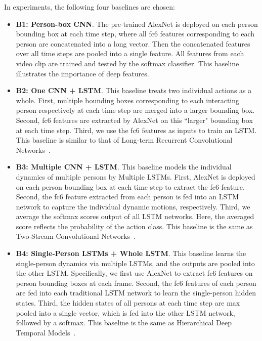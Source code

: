 \documentclass[9pt,journal,letterpaper,twocolumn]{IEEEtran}
\begin{document}
	
	In experiments, the following four baselines are chosen:
	\begin{itemize}
		\item {\bf B1: Person-box CNN}. The pre-trained AlexNet is deployed on each person bounding box at each time step, where all fc6 features corresponding to each person are concatenated into a long vector. Then the concatenated features over all time steps are pooled into a single feature. All features from each video clip are trained and tested by the softmax classifier. This baseline illustrates the importance of deep features.
		\item
		{\bf B2: One CNN + LSTM}. This baseline treats two individual actions as a whole.   First, multiple bounding boxes corresponding to each interacting person respectively at each time step are merged into a larger bounding box. Second, fc6 features are extracted by AlexNet on this ``larger" bounding box at each time step. Third, we use the fc6 features as inputs to train an LSTM. This baseline is similar to that of Long-term Recurrent Convolutional Networks~\cite{donahue2015long}.
		\item
		{\bf B3: Multiple CNN + LSTM}.  This  baseline models the individual dynamics of multiple persons by Multiple LSTMs. First, AlexNet is deployed on each person bounding box at each time step to extract the fc6 feature. Second, the fc6 feature extracted from each person is fed into an LSTM network to capture the individual dynamic motions, respectively. Third, we average the softmax scores output of all LSTM networks. Here, the averaged score reflects the probability of the action class. This baseline is the same as Two-Stream Convolutional Networks~\cite{simonyan2014two}.
		\item
		{\bf B4: Single-Person LSTMs + Whole LSTM}. This baseline learns the single-person dynamics via multiple LSTMs, and the outputs are pooled into the other LSTM. Specifically, we first use AlexNet to extract fc6 features on person bounding boxes at each frame. Second, the fc6 features of each person are fed into each traditional LSTM network to learn the single-person hidden states. Third, the hidden states of all persons at each time step are max pooled into a single vector, which is fed into the other LSTM network, followed by a softmax. This baseline is the same as Hierarchical Deep Temporal Models~\cite{ibrahim2015hierarchical}.
		
	\end{itemize}
	
\end{document}
